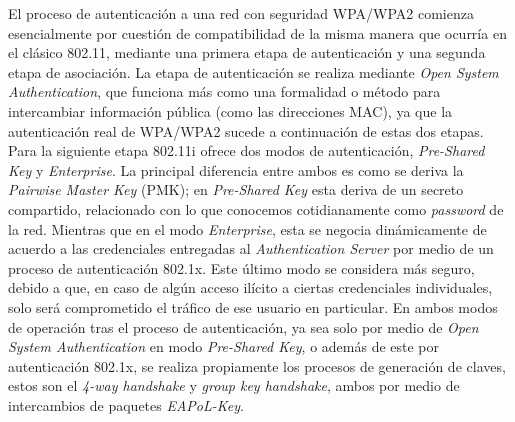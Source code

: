\documentclass[10pt,a4paper]{article}
\begin{document}
El proceso de autenticación a una red con seguridad WPA/WPA2 comienza esencialmente por cuestión de compatibilidad de la misma manera que ocurría en el clásico 802.11, mediante una primera etapa de autenticación y una segunda etapa de asociación. La etapa de autenticación se realiza mediante \textit{Open System Authentication}, que funciona más como una formalidad o método para intercambiar información pública (como las direcciones MAC), ya que la autenticación real de WPA/WPA2 sucede a continuación de estas dos etapas. Para la siguiente etapa 802.11i ofrece dos modos de autenticación, \textit{Pre-Shared Key} y \textit{Enterprise}. La principal diferencia entre ambos es como se deriva la \textit{Pairwise Master Key} (PMK); en \textit{Pre-Shared Key} esta deriva de un secreto compartido, relacionado con lo que conocemos cotidianamente como \textit{password} de la red. Mientras que en el modo \textit{Enterprise}, esta se negocia dinámicamente de acuerdo a las credenciales entregadas al \textit{Authentication Server} por medio de un proceso de autenticación 802.1x. Este último modo se considera más seguro, debido a que, en caso de algún acceso ilícito a ciertas credenciales individuales, solo será comprometido el tráfico de ese usuario en particular. En ambos modos de operación tras el proceso de autenticación, ya sea solo por medio de \textit{Open System Authentication} en modo \textit{Pre-Shared Key}, o además de este por autenticación 802.1x, se realiza propiamente los procesos de generación de claves, estos son el \textit{4-way handshake} y \textit{group key handshake}, ambos por medio de intercambios de paquetes \textit{EAPoL-Key}.
\end{document}
